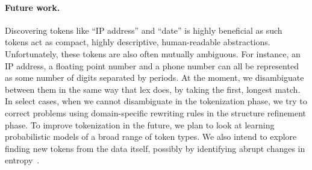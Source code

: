 \paragraph*{Future work.}  
Discovering tokens like ``IP address'' and ``date'' is highly beneficial
as such tokens act as compact, highly 
descriptive, human-readable abstractions. 
Unfortunately, these tokens are also often 
mutually ambiguous.  For instance, an IP address, a 
floating point number 
and a phone number can all be represented as some number of digits 
separated by periods.  At the moment, we disambiguate between them 
in the same way that lex does, by taking the first, longest match. 
In select cases, when we cannot disambiguate in the tokenization phase, we
try to correct problems using domain-specific rewriting rules in the 
structure refinement phase.    
To improve tokenization in the future, we plan to look at learning
probabilistic models of a broad range of token types.  
We also
intend to explore finding new tokens from the data itself,
possibly by identifying abrupt changes in entropy~\cite{hutchens98finding}.




